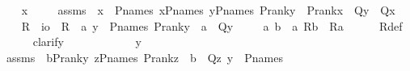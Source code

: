 \begin{isabellebody}
\ \ \isamarkupfalse%
\ x\ \isanewline
\ \ \isamarkupfalse%
\ assms\ {\isacharcolon}{\kern0pt}\ {\isachardoublequoteopen}x\ {\isasymin}\ P{\isacharunderscore}{\kern0pt}names{\isachardoublequoteclose}\ {\isachardoublequoteopen}{\isasymforall}x{\isasymin}P{\isacharunderscore}{\kern0pt}names{\isachardot}{\kern0pt}\ {\isacharparenleft}{\kern0pt}{\isasymforall}y{\isasymin}P{\isacharunderscore}{\kern0pt}names{\isachardot}{\kern0pt}\ P{\isacharunderscore}{\kern0pt}rank{\isacharparenleft}{\kern0pt}y{\isacharparenright}{\kern0pt}\ {\isacharless}{\kern0pt}\ P{\isacharunderscore}{\kern0pt}rank{\isacharparenleft}{\kern0pt}x{\isacharparenright}{\kern0pt}\ {\isasymlongrightarrow}\ Q{\isacharparenleft}{\kern0pt}y{\isacharparenright}{\kern0pt}{\isacharparenright}{\kern0pt}\ {\isasymlongrightarrow}\ Q{\isacharparenleft}{\kern0pt}x{\isacharparenright}{\kern0pt}{\isachardoublequoteclose}\isanewline
\ \ \isamarkupfalse%
\ R\ {\isacharcolon}{\kern0pt}{\isacharcolon}{\kern0pt}\ {\isachardoublequoteopen}i{\isasymRightarrow}o{\isachardoublequoteclose}\ \ {\isachardoublequoteopen}R\ {\isasymequiv}\ {\isasymlambda}a{\isachardot}{\kern0pt}\ {\isasymforall}y\ {\isasymin}\ P{\isacharunderscore}{\kern0pt}names{\isachardot}{\kern0pt}\ P{\isacharunderscore}{\kern0pt}rank{\isacharparenleft}{\kern0pt}y{\isacharparenright}{\kern0pt}\ {\isacharequal}{\kern0pt}\ a\ {\isasymlongrightarrow}\ Q{\isacharparenleft}{\kern0pt}y{\isacharparenright}{\kern0pt}{\isachardoublequoteclose}\ \isanewline
\ \ \isamarkupfalse%
\ {\isachardoublequoteopen}{\isacharparenleft}{\kern0pt}{\isasymAnd}a{\isachardot}{\kern0pt}\ {\isacharparenleft}{\kern0pt}{\isasymforall}b\ {\isasymin}\ a{\isachardot}{\kern0pt}\ R{\isacharparenleft}{\kern0pt}b{\isacharparenright}{\kern0pt}{\isacharparenright}{\kern0pt}\ {\isasymLongrightarrow}\ R{\isacharparenleft}{\kern0pt}a{\isacharparenright}{\kern0pt}{\isacharparenright}{\kern0pt}{\isachardoublequoteclose}\isanewline
\ \ \ \ \isamarkupfalse%
\ R{\isacharunderscore}{\kern0pt}def\isanewline
\ \ \ \ \isamarkupfalse%
\ clarify\ \isanewline
\ \ \isamarkupfalse%
\ {\isacharminus}{\kern0pt}\ \isanewline
\ \ \ \ \isamarkupfalse%
\ y\ \isanewline
\ \ \ \ \isamarkupfalse%
\ assms{}\ {\isacharcolon}{\kern0pt}\ {\isachardoublequoteopen}{\isasymforall}b{\isasymin}P{\isacharunderscore}{\kern0pt}rank{\isacharparenleft}{\kern0pt}y{\isacharparenright}{\kern0pt}{\isachardot}{\kern0pt}\ {\isasymforall}z{\isasymin}P{\isacharunderscore}{\kern0pt}names{\isachardot}{\kern0pt}\ P{\isacharunderscore}{\kern0pt}rank{\isacharparenleft}{\kern0pt}z{\isacharparenright}{\kern0pt}\ {\isacharequal}{\kern0pt}\ b\ {\isasymlongrightarrow}\ Q{\isacharparenleft}{\kern0pt}z{\isacharparenright}{\kern0pt}{\isachardoublequoteclose}\ {\isachardoublequoteopen}y\ {\isasymin}\ P{\isacharunderscore}{\kern0pt}names{\isachardoublequoteclose}\ \isanewline

\end{isabellebody}
